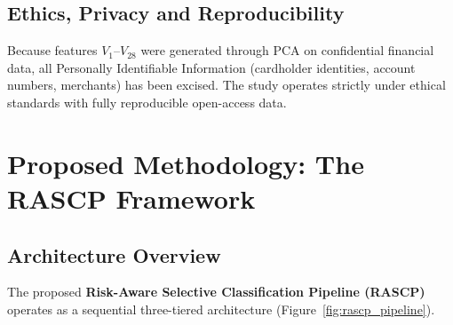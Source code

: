 \documentclass[10pt,a4paper,twocolumn]{article}
\begin{document}
\subsection{Ethics, Privacy and Reproducibility}
Because features $V_1$--$V_{28}$ were generated through PCA on confidential financial data, all Personally Identifiable Information (cardholder identities, account numbers, merchants) has been excised. The study operates strictly under ethical standards with fully reproducible open-access data.

\section{Proposed Methodology: The RASCP Framework}

\subsection{Architecture Overview}
The proposed \textbf{Risk-Aware Selective Classification Pipeline (RASCP)} operates as a sequential three-tiered architecture (Figure~\ref{fig:rascp_pipeline}).
\end{document}

